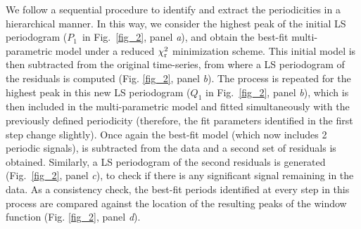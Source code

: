 \documentclass[a4paper,fleqn,usenatbib]{mnras}
\begin{document}
We follow a sequential procedure to identify and extract the periodicities in a hierarchical manner. In this way, we consider the highest peak of the initial LS periodogram ($P_1$~in Fig.~\ref{fig_2}, panel \textit{a}), and obtain the best-fit multi-parametric model under a reduced $\chi^2_{\rm r}$ minimization scheme. This initial model is then subtracted from the original time-series, from where a LS periodogram of the residuals is computed (Fig. \ref{fig_2}, panel \textit{b}). The process is repeated for the highest peak in this new LS periodogram ($Q_{1}$ in Fig.~\ref{fig_2}, panel \textit{b}), which is then included in the multi-parametric model and fitted simultaneously with the previously defined periodicity (therefore, the fit parameters identified in the first step change slightly). Once again the best-fit model (which now includes 2 periodic signals), is subtracted from the data and a second set of residuals is obtained. Similarly, a LS periodogram of the second residuals is generated (Fig.~\ref{fig_2}, panel \textit{c}), to check if there is any significant signal remaining in the data. As a consistency check, the best-fit periods identified at every step in this process are compared against the location of the resulting peaks of the window function (Fig. \ref{fig_2}, panel \textit{d}).
\end{document}
